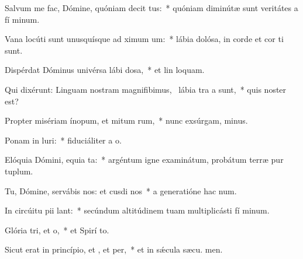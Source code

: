 \item Salvum me fac, Dómine, quóniam decit tus:~* quóniam diminútæ sunt veritátes a fí minum.
\item Vana locúti sunt unusquísque ad ximum um:~* lábia dolósa, in corde et cor ti sunt.
\item Dispérdat Dóminus univérsa lábi dosa,~* et lin loquam.
\item Qui dixérunt: Linguam nostram magnifibimus,~\pscross{} lábia tra a  sunt,~* quis noster  est?
\item Propter misériam ínopum, et mitum rum,~* nunc exsúrgam,  minus.
\item Ponam in luri:~* fiduciáliter a  o.
\item Elóquia Dómini, equia ta:~* argéntum igne examinátum, probátum terræ pur tuplum.
\item Tu, Dómine, servábis nos: et cusdi nos~* a generatióne hac  num.
\item In circúitu pii lant:~* secúndum altitúdinem tuam multiplicásti fí minum.
\item Glória tri, et o,~* et Spirí to.
\item Sicut erat in princípio, et , et per,~* et in sǽcula sæcu. men.

